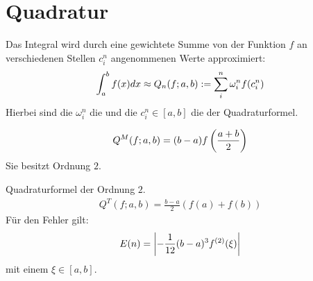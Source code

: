 \section{Quadratur}


 {

    Das Integral wird durch eine gewichtete Summe von der Funktion $f$ an verschiedenen
    Stellen $c_i^n$ angenommenen Werte approximiert:
    \begin{align*}
        \int_a^b f(x) dx \approx Q_n (f;a,b) := \sum_i^n \omega_i^n f(c_i^n)
    \end{align*}
    Hierbei sind die $\omega_i^n$ die  und die $c_i^n \in [a,b]$ die
     der Quadraturformel.
}

\vspace{1\baselineskip}


\vspace{1\baselineskip}


\vspace{1\baselineskip}

 {
    \begin{align*}
        Q^M (f;a,b) = (b-a) f\left( \frac{a+b}{2} \right)
    \end{align*}
    Sie besitzt Ordnung $2$.
}

\vspace{1\baselineskip}

 {

    Quadraturformel der Ordnung $2$.
    \begin{align*}
        Q^T (f;a,b) = \frac{b-a}{2} (f(a)+f(b))
    \end{align*}
    Für den Fehler gilt:
    \begin{align*}
        E(n) = \left\vert - \frac{1}{12} (b-a)^3 f^{(2)} (\xi) \right\vert
    \end{align*}
    mit einem $\xi \in [a,b]$.
}

\vspace{1\baselineskip}

